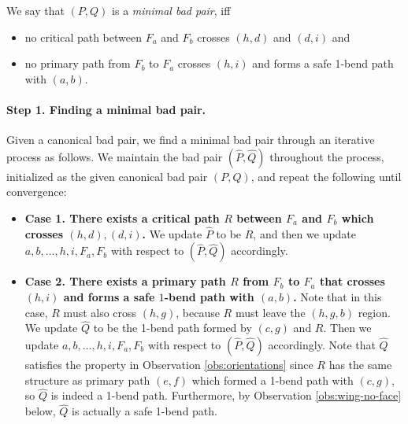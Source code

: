 \documentclass[11pt]{article}
\begin{document}

We say that $(P,Q)$ is a \emph{minimal bad pair}, iff
\begin{itemize}
    \item no critical path between $F_a$ and $F_b$ crosses $(h,d)$ and $(d,i)$ and
    \item no primary path from $F_b$ to $F_a$ crosses $(h,i)$ and forms a safe 1-bend path with $(a,b)$.
\end{itemize}


\paragraph{Step 1. Finding a minimal bad pair.} Given a canonical bad pair, we find a minimal bad pair through an iterative process as follows.
%
We maintain the bad pair $(\hat{P},\hat{Q})$ throughout the process, initialized as the given canonical bad pair $(P,Q)$, and repeat the following until convergence:
\begin{itemize}
    \item \textbf{Case 1. There exists a critical path $R$ between $F_a$ and $F_b$ which crosses $(h,d),(d,i)$.} We update $\hat P$ to be $R$, and then we update $a,b,\ldots,h,i,F_a,F_b$ with respect to $(\hat P,\hat Q)$ accordingly.
    \item \textbf{Case 2. There exists a primary path $R$ from $F_b$ to $F_a$ that crosses $(h,i)$ and forms a safe $1$-bend path with $(a,b)$.} Note that in this case, $R$ must also cross $(h,g)$, because $R$ must leave the $(h,g,b)$ region. We update $\hat Q$ to be the 1-bend path formed by $(c,g)$ and $R$. Then we update $a,b,\ldots,h,i,F_a,F_b$ with respect to $(\hat P,\hat Q)$ accordingly. Note that $\hat{Q}$ satisfies the property in Observation \ref{obs:orientations} since $R$ has the same structure as primary path $(e,f)$ which formed a 1-bend path with $(c,g)$, so $\hat{Q}$ is indeed a 1-bend path. Furthermore, by Observation \ref{obs:wing-no-face} below, $\hat{Q}$ is actually a safe 1-bend path. 
\end{itemize}
\end{document}
